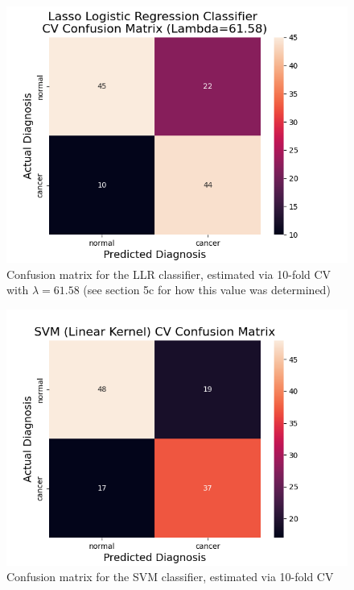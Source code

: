 \documentclass[twocolumn]{article}
\begin{document}
\begin{figure}[H]
    \centering
    \includegraphics[width=\linewidth]{figures/Lasso_Logistic_Regression_Classifier_CV_Confusion_Matrix.png}
    \caption{Confusion matrix for the LLR classifier, estimated via 10-fold CV with $\lambda = 61.58$ (see section 5c for how this value was determined)}
    \label{fig:cm-lasso}
\end{figure}

\begin{figure}[H]
    \centering
    \includegraphics[width=\linewidth]{figures/SVM_(Linear_Kernel)_CV_Confusion_Matrix.png}
    \caption{Confusion matrix for the SVM classifier, estimated via 10-fold CV}
    \label{fig:cm-svm}
\end{figure}
\end{document}
